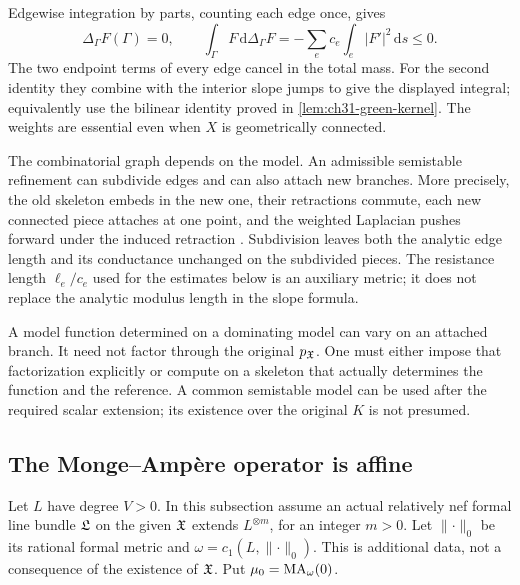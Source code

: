Edgewise integration by parts, counting each edge once, gives
\begin{equation}
\label{eq:graph-dirichlet-sign}
 \Delta_\Gamma F(\Gamma)=0,\qquad
 \int_\Gamma F\,\mathrm d\Delta_\Gamma F
       =-\sum_e c_e\int_e|F'|^2\,\mathrm ds\leq0.
\end{equation}
The two endpoint terms of every edge cancel in the total mass.
For the second identity they combine with the interior slope jumps
to give the displayed integral; equivalently use the bilinear
identity proved in \cref{lem:ch31-green-kernel}.
The weights are essential even when \(X\) is geometrically connected.

\begin{remark}
\label{rem:ch31-lengths}
The combinatorial graph depends on the model.  An admissible
semistable refinement can subdivide edges and can also attach new
branches.  More precisely, the old skeleton embeds in the new one,
their retractions commute, each new connected piece attaches at one
point, and the weighted Laplacian pushes forward under the induced
retraction \cite[Proposition~2.2.26]{Thu05}.
Subdivision leaves both the analytic edge length and its conductance
unchanged on the subdivided pieces.  The resistance length
\(\ell_e/c_e\) used for the estimates below is an auxiliary metric;
it does not replace the analytic modulus length in the slope formula.

A model function determined on a dominating model can vary on an
attached branch.  It need not factor through the original \(p_{\mathfrak X}\).
One must either impose that factorization explicitly or compute on
a skeleton that actually determines the function and the reference.
A common semistable model can be used after the required scalar
extension; its existence over the original \(K\) is not presumed.
\end{remark}

\subsection{The Monge--Amp\`ere operator is affine}
\label{sec:ch31-curve-affine}

Let \(L\) have degree \(V>0\).  In this subsection assume an actual
relatively nef formal line bundle \(\mathfrak L\) on the given \(\mathfrak X\)
extends \(L^{\otimes m}\), for an integer \(m>0\).
Let \(\lVert\cdot\rVert_0\) be its rational formal metric and
\(\omega=c_1(L,\lVert\cdot\rVert_0)\).
This is additional data, not a consequence of the existence of
\(\mathfrak X\).  Put \(\mu_0=\operatorname{MA}_\omega(0)\).

